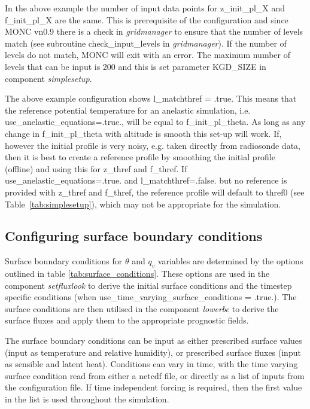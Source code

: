 \documentclass[a4paper,11pt]{article}
\begin{document}
In the above example the number of input data points for z\_init\_pl\_X
and f\_init\_pl\_X are the same. This is prerequisite of the configuration and
since MONC vn0.9 there is a check in \emph{gridmanager} to ensure that the
number of levels match (see subroutine check\_input\_levels in \emph{gridmanager}).
If the number of levels do not match, MONC will exit with an error. The
maximum number of levels that can be input is 200 and this is set parameter
KGD\_SIZE in component \emph{simplesetup}.

The above example configuration shows l\_matchthref = .true. This means that the
reference potential temperature for an anelastic simulation, i.e.
use\_anelastic\_equations=.true., will be equal to f\_init\_pl\_theta. As long
as any change in f\_init\_pl\_theta with altitude is smooth this set-up will
work. If, however the initial profile is very noisy, e.g. taken directly
from radiosonde data, then it is best to create a reference profile by smoothing
the initial profile (offline) and using this for z\_thref and f\_thref.
If use\_anelastic\_equations=.true. and l\_matchthref=.false. but no reference
is provided with z\_thref and f\_thref, the reference profile will default to
thref0 (see Table~\ref{tab:simplesetup}), which may not be appropriate for the
simulation.

\subsection{Configuring surface boundary conditions}

Surface boundary conditions for $\theta$ and $q_v$ variables are determined by
the options outlined in table \ref{tab:surface_conditions}. These options are
used in the component \emph{setfluxlook} to derive the initial surface conditions
and the timestep specific conditions (when use\_time\_varying\_surface\_conditions
= .true.). The surface conditions are then utilised in the component \emph{lowerbc}
to derive the surface fluxes and apply them to the appropriate prognostic fields.

The surface boundary conditions can be input as
either prescribed surface values (input as temperature and relative humidity),
or prescribed surface fluxes (input as sensible and latent heat).
Conditions can vary in time, with the time varying surface condition read from
either a netcdf file, or directly as a list of inputs from the configuration
file.  If time independent forcing is required, then the first value in the
list is used throughout the simulation.
\end{document}
